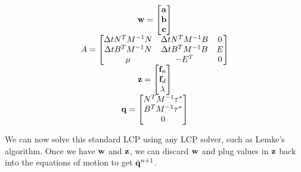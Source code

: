 \begin{equation}
\label{eq:slcp1}
\begin{array}{cc}
\mathbf{w} = \left[\begin{matrix} \mathbf{a} \\ \mathbf{b} \\ \mathbf{c}\end{matrix}\right] \\
A = \left[\begin{matrix}\Delta t N^TM^{-1}N & \Delta t N^TM^{-1}B & 0 \\ \Delta t B^TM^{-1}N & \Delta t B^TM^{-1}B & E \\ \mu & -E^T & 0\end{matrix}\right] \\
\mathbf{z} = \left[\begin{matrix}\mathbf{f}_n \\ \mathbf{f}_d \\ \lambda\end{matrix}\right] \\
\mathbf{q} = \left[\begin{matrix}N^TM^{-1}\tau^* \\ B^TM^{-1}\tau^* \\ 0\end{matrix}\right]
\end{array}
\end{equation}

We can now solve this standard LCP using any LCP solver, such as
Lemke's algorithm. Once we have $\mathbf{w}$ and $\mathbf{z}$, we can discard
$\mathbf{w}$ and plug values in $\mathbf{z}$ back into the equations of motion
to get $\dot{\mathbf{q}}^{n + 1}$.
